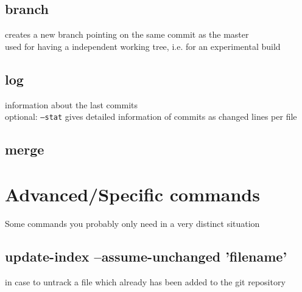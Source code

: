 \subsection*{branch}
creates a new branch pointing on the same commit as the master\\
used for having a independent working tree, i.e. for an experimental build

\subsection*{log}
information about the last commits \\
optional: \texttt{---stat} gives detailed information of commits as changed lines per file 

\subsection*{merge}


\subsection*{}

\section*{Advanced/Specific commands}
Some commands you probably only need in a very distinct situation
\subsection*{update-index –assume-unchanged 'filename'}
in case to untrack a file which already has been added to the git repository
